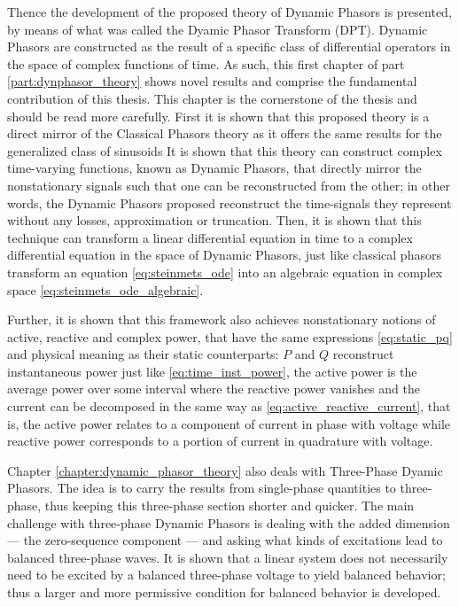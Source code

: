 	Thence the development of the proposed theory of Dynamic Phasors is presented, by means of what was called the Dyamic Phasor Transform (DPT). Dynamic Phasors are constructed as the result of a specific class of differential operators in the space of complex functions of time. As such, this first chapter of part \ref{part:dynphasor_theory} shows novel results and comprise the fundamental contribution of this thesis. This chapter is the cornerstone of the thesis and should be read more carefully. First it is shown that this proposed theory is a direct mirror of the Classical Phasors theory as it offers the same results for the generalized class of sinusoids It is shown that this theory can construct complex time-varying functions, known as Dynamic Phasors, that directly mirror the nonstationary signals such that one can be reconstructed from the other; in other words, the Dynamic Phasors proposed reconstruct the time-signals they represent without any losses, approximation or truncation. Then, it is shown that this technique can transform a linear differential equation in time to a complex differential equation in the space of Dynamic Phasors, just like classical phasors transform an equation \eqref{eq:steinmets_ode} into an algebraic equation in complex space \eqref{eq:steinmets_ode_algebraic}.

	Further, it is shown that this framework also achieves nonstationary notions of active, reactive and complex power, that have the same expressions \eqref{eq:static_pq} and physical meaning as their static counterparts: $P$ and $Q$ reconstruct instantaneous power just like \eqref{eq:time_inst_power}, the active power is the average power over some interval where the reactive power vanishes and the current can be decomposed in the same way as \eqref{eq:active_reactive_current}, that is, the active power relates to a component of current in phase with voltage while reactive power corresponds to a portion of current in quadrature with voltage.

	Chapter \ref{chapter:dynamic_phasor_theory} also deals with Three-Phase Dyamic Phasors. The idea is to carry the results from single-phase quantities to three-phase, thus keeping this three-phase section shorter and quicker. The main challenge with three-phase Dynamic Phasors is dealing with the added dimension — the zero-sequence component — and asking what kinds of excitations lead to balanced three-phase waves. It is shown that a linear system does not necessarily need to be excited by a balanced three-phase voltage to yield balanced behavior; thus a larger and more permissive condition for balanced behavior is developed.

